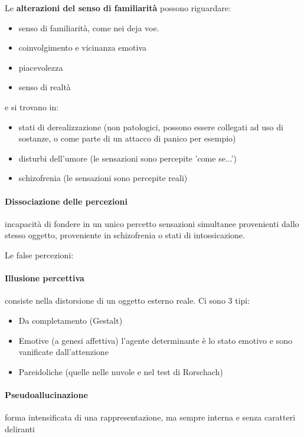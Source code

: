 {Le \textbf{alterazioni del senso di familiarità} possono riguardare:
\begin{itemize}
	\item senso di familiarità, come nei deja voe. 
	\item coinvolgimento e vicinanza emotiva
	\item piacevolezza
	\item senso di realtà
\end{itemize}
e si trovano in:
\begin{itemize}
	\item stati di derealizzazione (non patologici, possono essere collegati ad uso di sostanze, o come parte di un attacco di panico per esempio)
	\item disturbi dell'umore (le sensazioni sono percepite 'come se...')
	\item schizofrenia (le sensazioni sono percepite reali)
\end{itemize}

\paragraph{Dissociazione delle percezioni} incapacità di fondere in un unico percetto sensazioni simultanee provenienti dallo stesso oggetto, proveniente in schizofrenia o stati di intossicazione.

Le false percezioni:
\paragraph{Illusione percettiva}consiste nella distorsione di un oggetto esterno reale. Ci sono 3 tipi:
\begin{itemize}
	\item Da completamento (Gestalt)
	\item Emotive (a genesi affettiva) l'agente determinante è lo stato emotivo e sono vanificate dall'attenzione
	\item Pareidoliche (quelle nelle nuvole e nel test di Rorschach)
\end{itemize}
\paragraph{Pseudoallucinazione}  forma intensificata di una rappresentazione, ma sempre interna e senza caratteri deliranti
}
